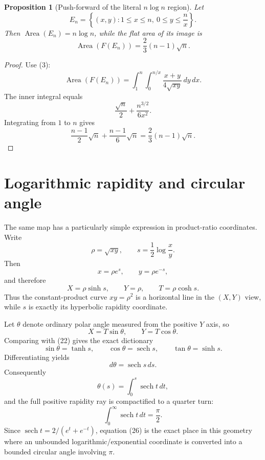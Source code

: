 \documentclass[11pt]{amsart}
\newtheorem{proposition}{Proposition}
\theoremstyle{remark}
\begin{document}
\begin{proposition}[Push-forward of the literal $n\log n$ region]\label{prop:nlognimage}
Let
\[
E_n=\left\{(x,y):1\le x\le n,\ 0\le y\le\frac n x\right\}.
\]
Then $\operatorname{Area}(E_n)=n\log n$, while the flat area of its image is
\begin{equation}
\boxed{
\operatorname{Area}(F(E_n))
=\frac23(n-1)\sqrt n.}
\tag{19}
\end{equation}
\end{proposition}

\begin{proof}
Use (3):
\[
\operatorname{Area}(F(E_n))
=\int_1^n\int_0^{n/x}
\frac{x+y}{4\sqrt{xy}}\,dy\,dx.
\]
The inner integral equals
\[
\frac{\sqrt n}{2}+\frac{n^{3/2}}{6x^2}.
\]
Integrating from $1$ to $n$ gives
\[
\frac{n-1}{2}\sqrt n+\frac{n-1}{6}\sqrt n
=\frac23(n-1)\sqrt n.
\]
\end{proof}

\section{Logarithmic rapidity and circular angle}
The same map has a particularly simple expression in product-ratio coordinates.  Write
\begin{equation}
\rho=\sqrt{xy},\qquad
s=\frac12\log\frac{x}{y}. \tag{20}
\end{equation}
Then
\begin{equation}
x=\rho e^s,\qquad y=\rho e^{-s}, \tag{21}
\end{equation}
and therefore
\begin{equation}
\boxed{
X=\rho\sinh s,\qquad
Y=\rho,\qquad
T=\rho\cosh s.}
\tag{22}
\end{equation}
Thus the constant-product curve $xy=\rho^2$ is a horizontal line in the $(X,Y)$ view, while $s$ is exactly its hyperbolic rapidity coordinate.

Let $\theta$ denote ordinary polar angle measured from the positive $Y$ axis, so
\[
X=T\sin\theta,\qquad Y=T\cos\theta.
\]
Comparing with (22) gives the exact dictionary
\begin{equation}
\boxed{
\sin\theta=\tanh s,\qquad
\cos\theta=\operatorname{sech}s,\qquad
\tan\theta=\sinh s.}
\tag{23}
\end{equation}
Differentiating yields
\begin{equation}
\boxed{d\theta=\operatorname{sech}s\,ds.}\tag{24}
\end{equation}
Consequently
\begin{equation}
\boxed{
\theta(s)=\int_0^s\operatorname{sech}t\,dt,}
\tag{25}
\end{equation}
and the full positive rapidity ray is compactified to a quarter turn:
\begin{equation}
\boxed{
\int_0^{\infty}\operatorname{sech}t\,dt=\frac\pi2.}
\tag{26}
\end{equation}
Since $\operatorname{sech}t=2/(e^t+e^{-t})$, equation (26) is the exact place in this geometry where an unbounded logarithmic/exponential coordinate is converted into a bounded circular angle involving $\pi$.
\end{document}
